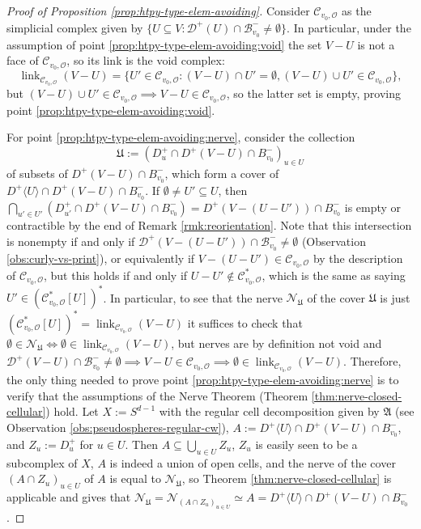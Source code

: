 \documentclass[10pt,a4paper]{amsart}
\DeclareMathOperator{\link}{\mathrm{link}}
\begin{document}
\begin{proof}[Proof of Proposition \ref{prop:htpy-type-elem-avoiding}]
    Consider $\mathscr{C}_{v_0,\mathscr{O}}$ as the simplicial complex given by $\{U\subseteq V:\mathscr{D}^+(U)\cap\mathscr{B}^-_{v_0}\neq\emptyset\}$. In particular, under the assumption of point \ref{prop:htpy-type-elem-avoiding:void} the set $V-U$ is not a face of $\mathscr{C}_{v_0,\mathscr{O}}$, so its link is the void complex:
    \[
        \link_{\mathscr{C}_{v_0,\mathscr{O}}}(V-U)=\{U'\in\mathscr{C}_{v_0,\mathscr{O}}:(V-U)\cap U'=\emptyset,(V-U)\cup U'\in\mathscr{C}_{v_0,\mathscr{O}}\},
    \]
    but $(V-U)\cup U'\in\mathscr{C}_{v_0,\mathscr{O}}\implies V-U\in\mathscr{C}_{v_0,\mathscr{O}}$, so the latter set is empty, proving point \ref{prop:htpy-type-elem-avoiding:void}.

    For point \ref{prop:htpy-type-elem-avoiding:nerve}, consider the collection
    \[
        \mathfrak{U}:=(D^+_u\cap D^+(V-U)\cap B^-_{v_0})_{u\in U}
    \]
    of subsets of $D^+(V-U)\cap B^-_{v_0}$, which form a cover of $D^+\langle U\rangle\cap D^+(V-U)\cap B^-_{v_0}$. If $\emptyset\neq U'\subseteq U$, then $\bigcap_{u'\in U'}(D^+_{u'}\cap D^+(V-U)\cap B^-_{v_0})=D^+(V-(U-U'))\cap B^-_{v_0}$ is empty or contractible by the end of Remark \ref{rmk:reorientation}. Note that this intersection is nonempty if and only if $\mathscr{D}^+(V-(U-U'))\cap\mathscr{B}^-_{v_0}\neq\emptyset$ (Observation \ref{obs:curly-vs-print}), or equivalently if $V-(U-U')\in\mathscr{C}_{v_0,\mathscr{O}}$ by the description of $\mathscr{C}_{v_0,\mathscr{O}}$, but this holds if and only if $U-U'\notin\mathscr{C}_{v_0,\mathscr{O}}^*$, which is the same as saying $U'\in(\mathscr{C}_{v_0,\mathscr{O}}^*[U])^*$. In particular, to see that the nerve $\mathscr{N}_{\mathfrak{U}}$ of the cover $\mathfrak{U}$ is just $(\mathscr{C}_{v_0,\mathscr{O}}^*[U])^*=\link_{\mathscr{C}_{v_0,\mathscr{O}}}(V-U)$ it suffices to check that $\emptyset\in\mathscr{N}_\mathfrak{U}\iff\emptyset\in\link_{\mathscr{C}_{v_0,\mathscr{O}}}(V-U)$, but nerves are by definition not void and $\mathscr{D}^+(V-U)\cap\mathscr{B}^-_{v_0}\neq\emptyset\implies V-U\in\mathscr{C}_{v_0,\mathscr{O}}\implies\emptyset\in\link_{\mathscr{C}_{v_0,\mathscr{O}}}(V-U)$. Therefore, the only thing needed to prove point \ref{prop:htpy-type-elem-avoiding:nerve} is to verify that the assumptions of the Nerve Theorem (Theorem \ref{thm:nerve-closed-cellular}) hold. 
    Let $X:=S^{d-1}$ with the regular cell decomposition given by $\mathfrak{A}$ (see Observation \ref{obs:pseudospheres-regular-cw}), $A:=D^+\langle U\rangle\cap D^+(V-U)\cap B^-_{v_0}$, and $Z_u:=D^+_u$ for $u\in U$. Then $A\subseteq\bigcup_{u\in U}Z_u$, $Z_u$ is easily seen to be a subcomplex of $X$, $A$ is indeed a union of open cells, and the nerve of the cover $(A\cap Z_u)_{u\in U}$ of $A$ is equal to $\mathscr{N}_\mathfrak{U}$, so Theorem \ref{thm:nerve-closed-cellular} is applicable and gives that $\mathscr{N}_\mathfrak{U}=\mathscr{N}_{(A\cap Z_u)_{u\in U}}\simeq A=D^+\langle U\rangle\cap D^+(V-U)\cap B^-_{v_0}$.


\end{proof}
\end{document}
